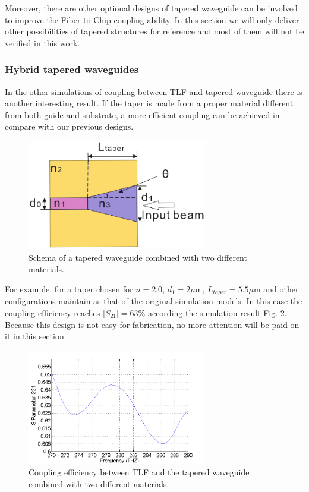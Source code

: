 Moreover, there are other optional designs of tapered waveguide can be involved to improve the Fiber-to-Chip coupling ability. In this section we will only deliver other possibilities of tapered structures for reference and most of them will not be verified in this work.   \\
\subsubsection*{Hybrid tapered waveguides}%
In the other simulations of coupling between TLF and tapered waveguide there is another interesting result. If the taper is made from a proper material different from both guide and substrate, a more efficient coupling can be achieved in compare with our previous designs.\\
 
\begin{figure}[!ht]
\centering
\includegraphics[width=0.7\textwidth]{bilder/tapered_waveguide_others}
\caption{Schema of a tapered waveguide combined with two different materials.}
\label{fig:tapered_waveguide_others}
\end{figure}
For example, for a taper chosen for $n=2.0$, $d_{1}=2\mu$m, $L_{taper}=5.5\mu$m and other configurations maintain as that of the original simulation models. In this case the coupling efficiency reaches $|S_{21}|=63\%$ according the simulation result Fig. \ref{fig:tapered_waveguide_others_coupling}.  Because this design is not easy for fabrication, no more attention will be paid on it in this section.\\
   
\begin{figure}[!ht]
\centering
\includegraphics[width=0.7\textwidth]{bilder/s21_tapered_waveguide_others}
\caption{Coupling efficiency between TLF and the tapered waveguide combined with two different materials.}
\label{fig:tapered_waveguide_others_coupling}
\end{figure}

